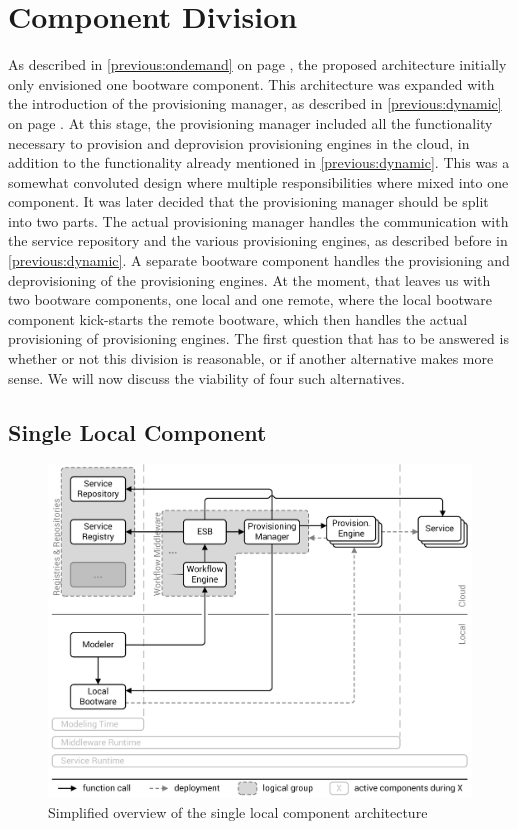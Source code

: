 \section{Component Division}
\label{design:division}

As described in \autoref{previous:ondemand} on page \pageref{previous:ondemand}, the proposed architecture initially only envisioned one bootware component.
This architecture was expanded with the introduction of the provisioning manager, as described in \autoref{previous:dynamic} on page \pageref{previous:dynamic}.
At this stage, the provisioning manager included all the functionality necessary to provision and deprovision provisioning engines in the cloud, in addition to the functionality already mentioned in \autoref{previous:dynamic}.
This was a somewhat convoluted design where multiple responsibilities where mixed into one component.
It was later decided that the provisioning manager should be split into two parts.
The actual provisioning manager handles the communication with the service repository and the various provisioning engines, as described before in \autoref{previous:dynamic}.
A separate bootware component handles the provisioning and deprovisioning of the provisioning engines.
At the moment, that leaves us with two bootware components, one local and one remote, where the local bootware component kick-starts the remote bootware, which then handles the actual provisioning of provisioning engines.
The first question that has to be answered is whether or not this division is reasonable, or if another alternative makes more sense.
We will now discuss the viability of four such alternatives.

\subsection{Single Local Component}

\begin{figure}[!htbp]
	\centering
	\includegraphics[resolution=600]{design/assets/local}
	\caption{Simplified overview of the single local component architecture}
	\label{image:local}
\end{figure}

